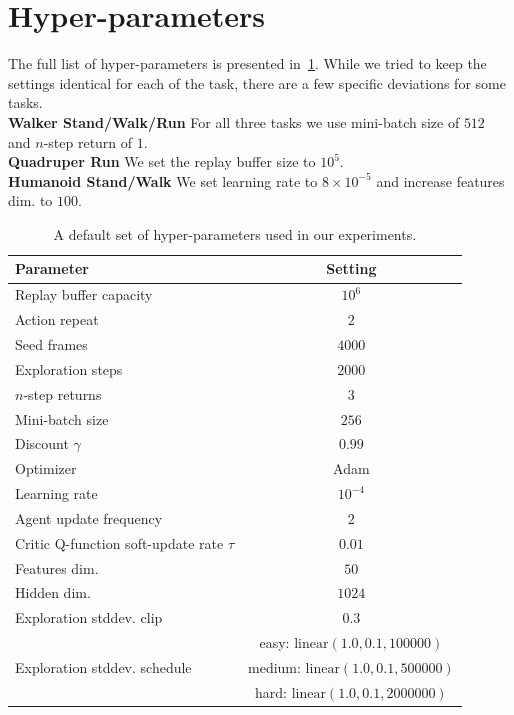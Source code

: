 \newpage

\section{Hyper-parameters}
\label{section:hyperparams}

The full list of hyper-parameters is presented in~\cref{table:hyper_params}. While we tried to keep the settings identical for each of the task, there are a few specific deviations for some tasks.\\
\textbf{Walker Stand/Walk/Run} For all three  tasks we use mini-batch size of $512$ and $n$-step return of $1$.\\
\textbf{Quadruper Run} We set the replay buffer size to $10^5$.\\
\textbf{Humanoid Stand/Walk} We set learning rate to $8\times 10^{-5}$ and increase features dim. to $100$.


\begin{table}[hb!]
\caption{\label{table:hyper_params} A default set of hyper-parameters used in our experiments.}
\centering
\begin{tabular}{lc}
\hline
Parameter        & Setting \\
\hline
Replay buffer capacity & $10^6$ \\
Action repeat & $2$ \\
Seed frames & $4000$ \\
Exploration steps & $2000$ \\
$n$-step returns & $3$ \\
Mini-batch size & $256$ \\
Discount $\gamma$ & $0.99$ \\
Optimizer & Adam \\
Learning rate & $10^{-4}$ \\
Agent update frequency & $2$ \\
Critic Q-function soft-update rate $\tau$ & $0.01$ \\
Features dim. & $50$ \\
Hidden dim. & $1024$ \\
Exploration stddev. clip & $0.3$ \\
\multirow{3}{*}{Exploration stddev. schedule}& easy: $\mathrm{linear}(1.0, 0.1, 100000)$\\ & medium: $\mathrm{linear}(1.0, 0.1, 500000)$\\& hard: $\mathrm{linear}(1.0, 0.1, 2000000)$\\


\hline
\end{tabular}

\end{table}

